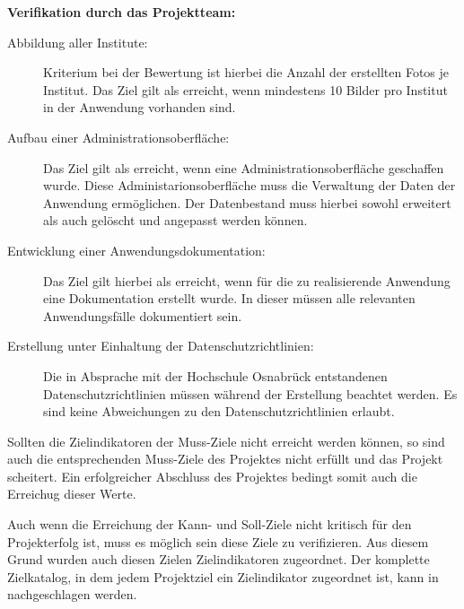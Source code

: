 \textbf{Verifikation durch das Projektteam:}
\begin{description}
  \item[Abbildung aller Institute:]
  Kriterium bei der Bewertung ist hierbei
  die Anzahl der erstellten Fotos je Institut. Das Ziel gilt als erreicht, wenn
  mindestens 10 Bilder pro Institut in der Anwendung vorhanden sind.

  \item[Aufbau einer Administrationsoberfläche:] Das Ziel gilt als erreicht, wenn eine
  Administrationsoberfläche geschaffen wurde. Diese Administarionsoberfläche muss
  die Verwaltung der Daten der Anwendung ermöglichen. Der Datenbestand muss
  hierbei sowohl erweitert als auch gelöscht und angepasst werden können.

  \item[Entwicklung einer Anwendungsdokumentation:] Das Ziel gilt hierbei als erreicht, wenn
  für die zu realisierende Anwendung eine Dokumentation erstellt wurde. In dieser
  müssen alle relevanten Anwendungsfälle dokumentiert sein.

  \item[Erstellung unter Einhaltung der Datenschutzrichtlinien:] 
  Die in Absprache mit der Hochschule Osnabrück entstandenen
  Datenschutzrichtlinien müssen während der Erstellung beachtet werden. Es sind
  keine Abweichungen zu den Datenschutzrichtlinien erlaubt.
\end{description}

Sollten die Zielindikatoren der Muss-Ziele nicht erreicht werden können, 
so sind auch die entsprechenden Muss-Ziele des Projektes nicht erfüllt 
und das Projekt scheitert. Ein erfolgreicher
Abschluss des Projektes bedingt somit auch die Erreichug dieser Werte.

Auch wenn die Erreichung der Kann- und Soll-Ziele nicht kritisch für den
Projekterfolg ist, muss es möglich sein diese Ziele zu verifizieren. Aus diesem
Grund wurden auch diesen Zielen Zielindikatoren zugeordnet. Der komplette
Zielkatalog, in dem jedem Projektziel ein Zielindikator zugeordnet ist, kann in
 nachgeschlagen werden.



